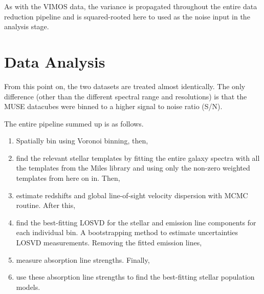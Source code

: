 		As with the VIMOS data, the variance is propagated throughout the entire data reduction pipeline and is squared-rooted here to used as the noise input in the analysis stage. 
\section{Data Analysis}
	\label{sec:analysis}
	From this point on, the two datasets are treated almost identically. The only difference (other than the different spectral range and resolutions) is that the MUSE datacubes were binned to a higher signal to noise ratio (S/N).



	The entire pipeline summed up is as follows.
	\begin{enumerate}
		\item Spatially bin using Voronoi binning, then,
		\item find the relevant stellar templates by fitting the entire galaxy spectra with all the templates from the Miles library and using only the non-zero weighted templates from here on in. Then,
		\item estimate redshifts and global line-of-sight velocity dispersion with MCMC routine. After this,
		\item find the best-fitting LOSVD for the stellar and emission line components for each individual bin. A bootstrapping method to estimate uncertainties LOSVD measurements. Removing the fitted emission lines,
		\item measure absorption line strengths. Finally, 
		\item use these absorption line strengths to find the best-fitting stellar population models.
	\end{enumerate}


